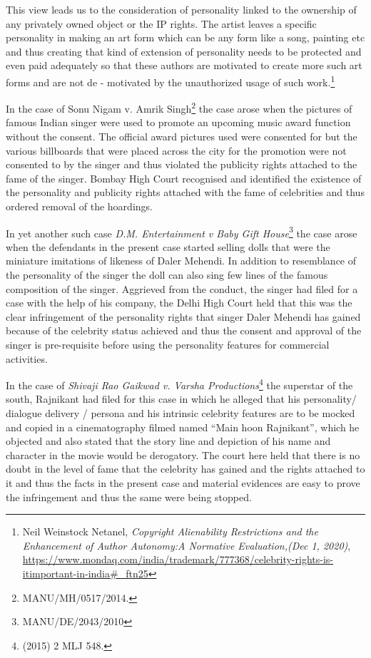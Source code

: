 \begin{multicols}{2}
\noi
This view leads us to the consideration of personality linked to the ownership of any privately
owned object or the IP rights. The artist leaves a specific personality in making an art form
which can be any form like a song, painting etc and thus creating that kind of extension of
personality needs to be protected and even paid adequately so that these authors are
motivated to create more such art forms and are not de - motivated by the unauthorized usage
of such work.\footnote{Neil Weinstock Netanel, \textit{Copyright Alienability Restrictions and the Enhancement of Author Autonomy:A
Normative Evaluation,(Dec 1, 2020)}, \url{https://www.mondaq.com/india/trademark/777368/celebrity-rights-is-itimportant-in-india#_ftn25}}

\noi
In the case of Sonu Nigam v. Amrik Singh\footnote{MANU/MH/0517/2014.} the case arose when the pictures of famous
Indian singer were used to promote an upcoming music award function without the consent.
The official award pictures used were consented for but the various billboards that were
placed across the city for the promotion were not consented to by the singer and thus violated
the publicity rights attached to the fame of the singer. Bombay High Court recognised and
identified the existence of the personality and publicity rights attached with the fame of
celebrities and thus ordered removal of the hoardings.

\noi
In yet another such case \textit{D.M. Entertainment v Baby Gift House}\footnote{MANU/DE/2043/2010} the case arose when the
defendants in the present case started selling dolls that were the miniature imitations of
likeness of Daler Mehendi. In addition to resemblance of the personality of the singer the doll
can also sing few lines of the famous composition of the singer. Aggrieved from the conduct,
the singer had filed for a case with the help of his company, the Delhi High Court held that
this was the clear infringement of the personality rights that singer Daler Mehendi has gained
because of the celebrity status achieved and thus the consent and approval of the singer is
pre-requisite before using the personality features for commercial activities.

\noi
In the case of \textit{Shivaji Rao Gaikwad v. Varsha Productions}\footnote{(2015) 2 MLJ 548.} the superstar of the south,
Rajnikant had filed for this case in which he alleged that his personality/ dialogue delivery /
persona and his intrinsic celebrity features are to be mocked and copied in a cinematography
filmed named “Main hoon Rajnikant”, which he objected and also stated that the story line and depiction of his name and character in the movie would be derogatory. The court here
held that there is no doubt in the level of fame that the celebrity has gained and the rights
attached to it and thus the facts in the present case and material evidences are easy to prove
the infringement and thus the same were being stopped.


\end{multicols}
